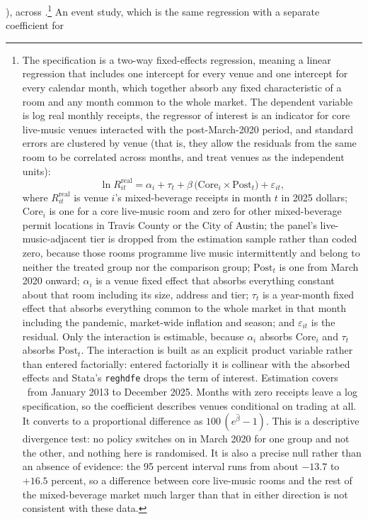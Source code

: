 \NVenueDidP), across \NVenueDidN.\footnote{The specification is a two-way fixed-effects regression, meaning a
linear regression that includes one intercept for every venue and one
intercept for every calendar month, which together absorb any fixed
characteristic of a room and any month common to the whole market. The
dependent variable is log real monthly receipts, the regressor of interest is
an indicator for core live-music venues interacted with the post-March-2020
period, and standard errors are clustered by venue (that is, they allow the
residuals from the same room to be correlated across months, and treat venues
as the independent units):
\[
\ln R^{\mathrm{real}}_{it}
  = \alpha_i + \tau_t
  + \beta\,\bigl(\mathrm{Core}_i \times \mathrm{Post}_t\bigr)
  + \varepsilon_{it},
\]
where \(R^{\mathrm{real}}_{it}\) is venue \(i\)'s mixed-beverage receipts in
month \(t\) in 2025 dollars; \(\mathrm{Core}_i\) is one for a core live-music
room and zero for other mixed-beverage permit locations in Travis County or the
City of Austin; the panel's live-music-adjacent tier is dropped from the
estimation sample rather than coded zero, because those rooms programme live
music intermittently and belong to neither the treated group nor the
comparison group; \(\mathrm{Post}_t\) is one from March 2020 onward; \(\alpha_i\) is a
venue fixed effect that absorbs everything constant about that room including
its size, address and tier; \(\tau_t\) is a year-month fixed effect that
absorbs everything common to the whole market in that month including the
pandemic, market-wide inflation and season; and \(\varepsilon_{it}\) is the
residual. Only the interaction is estimable, because \(\alpha_i\) absorbs
\(\mathrm{Core}_i\) and \(\tau_t\) absorbs \(\mathrm{Post}_t\). The
interaction is built as an explicit product variable rather than entered
factorially: entered factorially it is collinear with the absorbed effects and
Stata's \texttt{reghdfe} drops the term of interest. Estimation covers
\NVenueDidN\ from January 2013 to December 2025. Months with zero receipts
leave a log specification, so the coefficient describes venues conditional on
trading at all. It converts to a proportional difference as
\(100\,(e^{\hat\beta} - 1)\). This is a descriptive divergence test: no policy
switches on in March 2020 for one group and not the other, and nothing here is
randomised. It is also a precise null rather than an absence of evidence: the
95 percent interval runs from about $-13.7$ to $+16.5$ percent, so a
difference between core live-music rooms and the rest of the mixed-beverage
market much larger than that in either direction is not consistent with these
data.} An event study, which is the same regression with a separate coefficient for
